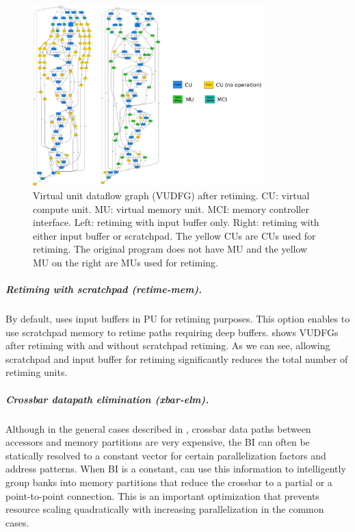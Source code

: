 \begin{figure}
\centering
\includegraphics[width=0.8\textwidth]{figs/retiming.pdf}
\caption[Retiming]{
  Virtual unit dataflow graph (VUDFG) after retiming. CU: virtual compute unit. MU: virtual memory
  unit. MCI: memory controller interface.
  Left: retiming with input buffer only. Right: retiming with either input buffer or scratchpad.
  The yellow CUs are CUs used for retiming. The original program does not have MU and the yellow MU
  on the right are MUs used for retiming. 
}
\label{fig:retiming}
\end{figure}
\subparagraph{Retiming with scratchpad (retime-mem).} 
By default, \name{} uses input buffers in PU for retiming purposes. 
This option enables \name{} to use scratchpad memory to retime paths requiring deep buffers.
 shows VUDFGs after retiming with and without scratchpad retiming. As we can see,
allowing scratchpad and input buffer for retiming significantly reduces the total number of retiming
units.

\subparagraph{Crossbar datapath elimination (xbar-elm).}
Although in the general cases described in , 
crossbar data paths between accessors and memory partitions are very expensive, 
the BI can often be statically resolved to a constant vector for certain
parallelization factors and address patterns.  
When BI is a constant, \name{} can use this information to intelligently 
group banks into memory partitions that reduce the crossbar to a partial 
or a point-to-point connection.
This is an important optimization that prevents resource scaling quadratically with increasing
parallelization in the common cases.

